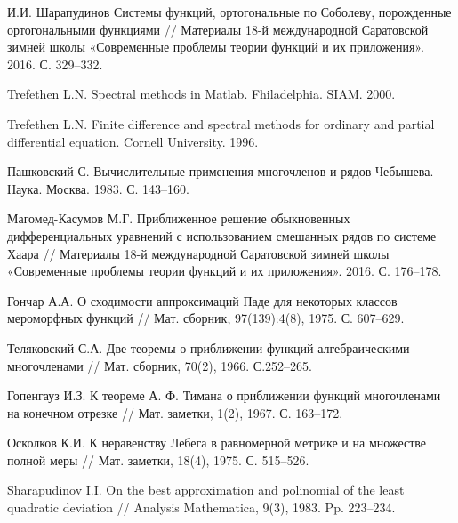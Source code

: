 \begin{thebibliography}{20}
И.И. Шарапудинов
Системы функций, ортогональные по Соболеву, порожденные ортогональными функциями
// Материалы 18-й международной Саратовской зимней школы «Современные проблемы теории функций и их приложения». 2016. С. 329--332.



{Trefethen  L.N.} Spectral methods in Matlab. Fhiladelphia. SIAM. 2000.



{Trefethen  L.N.}
Finite difference and spectral methods for ordinary and partial differential equation. Cornell University. 1996.



{Пашковский С.} Вычислительные применения многочленов и рядов Чебышева. Наука. Москва. 1983. С. 143--160.



{Магомед-Касумов М.Г.}
Приближенное решение обыкновенных дифференциальных уравнений с использованием смешанных рядов по системе Хаара
// Материалы 18-й международной Саратовской зимней школы «Современные проблемы теории функций и их приложения». 2016. С. 176--178.



{Гончар А.А.}
О сходимости аппроксимаций Паде для некоторых классов мероморфных функций
// Мат. сборник, 97(139):4(8), 1975. С. 607--629.



{Теляковский С.А.}
Две теоремы о приближении функций алгебраическими многочленами
// Мат. сборник, 70(2), 1966. С.252--265.



{Гопенгауз И.З.}
К теореме А. Ф. Тимана о приближении функций многочленами на конечном отрезке
// Мат. заметки, 1(2), 1967. С. 163--172.



{Осколков К.И.}
К неравенству Лебега в равномерной метрике и на множестве полной меры
// Мат.  заметки, 18(4), 1975. С. 515--526.



{Sharapudinov I.I.}
On the best approximation and polinomial of the least quadratic deviation
// Analysis Mathematica, 9(3), 1983. Pp. 223--234.




\end{thebibliography}
